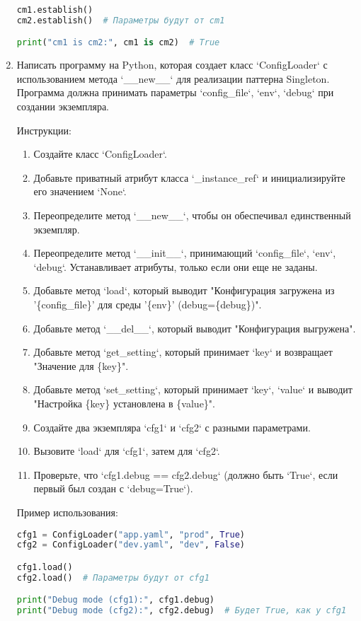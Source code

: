 \begin{enumerate}
\begin{lstlisting}[language=Python]
cm1.establish()
cm2.establish()  # Параметры будут от cm1

print("cm1 is cm2:", cm1 is cm2)  # True
\end{lstlisting}

\item Написать программу на Python, которая создает класс `ConfigLoader` с использованием метода `\_\_new\_\_` для реализации паттерна Singleton. Программа должна принимать параметры `config\_file`, `env`, `debug` при создании экземпляра.

Инструкции:
\begin{enumerate}
    \item Создайте класс `ConfigLoader`.
    \item Добавьте приватный атрибут класса `\_instance\_ref` и инициализируйте его значением `None`.
    \item Переопределите метод `\_\_new\_\_`, чтобы он обеспечивал единственный экземпляр.
    \item Переопределите метод `\_\_init\_\_`, принимающий `config\_file`, `env`, `debug`. Устанавливает атрибуты, только если они еще не заданы.
    \item Добавьте метод `load`, который выводит "Конфигурация загружена из '\{config\_file\}' для среды '\{env\}' (debug=\{debug\})".
    \item Добавьте метод `\_\_del\_\_`, который выводит "Конфигурация выгружена".
    \item Добавьте метод `get\_setting`, который принимает `key` и возвращает "Значение для \{key\}".
    \item Добавьте метод `set\_setting`, который принимает `key`, `value` и выводит "Настройка \{key\} установлена в \{value\}".
    \item Создайте два экземпляра `cfg1` и `cfg2` с разными параметрами.
    \item Вызовите `load` для `cfg1`, затем для `cfg2`.
    \item Проверьте, что `cfg1.debug == cfg2.debug` (должно быть `True`, если первый был создан с `debug=True`).
\end{enumerate}

Пример использования:
\begin{lstlisting}[language=Python]
cfg1 = ConfigLoader("app.yaml", "prod", True)
cfg2 = ConfigLoader("dev.yaml", "dev", False)

cfg1.load()
cfg2.load()  # Параметры будут от cfg1

print("Debug mode (cfg1):", cfg1.debug)
print("Debug mode (cfg2):", cfg2.debug)  # Будет True, как у cfg1
\end{lstlisting}


\end{enumerate}
